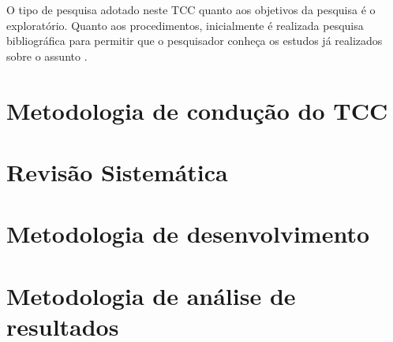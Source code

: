 O tipo de pesquisa adotado neste TCC  quanto aos objetivos da pesquisa é o exploratório. Quanto aos procedimentos, inicialmente é realizada pesquisa bibliográfica para permitir que o pesquisador conheça os estudos já realizados sobre o assunto \cite[pág. 31]{fonseca}. 






\section{Metodologia de condução do TCC}

\section{Revisão Sistemática}

\section{Metodologia de desenvolvimento}

\section{Metodologia de análise de resultados}







